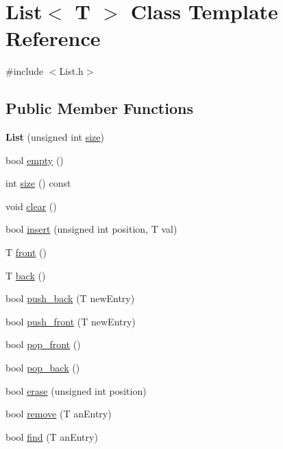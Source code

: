 \hypertarget{class_list}{}\section{List$<$ T $>$ Class Template Reference}
\label{class_list}


{\ttfamily \#include $<$List.\+h$>$}

\subsection*{Public Member Functions}
\begin{DoxyCompactItemize}
\item 
\mbox{\label{class_list_a210dcb839a4a5da20c98d0cd48e526f8}} 
{\bfseries List} (unsigned int \hyperlink{class_list_aec8852ab225094e14ad424e8d71a4dac}{size})
\item 
bool \hyperlink{class_list_a3737ca60365287ce663393d8c07d1a41}{empty} ()
\item 
int \hyperlink{class_list_aec8852ab225094e14ad424e8d71a4dac}{size} () const
\item 
void \hyperlink{class_list_ae296516a252e11963dbf963727ce429a}{clear} ()
\item 
bool \hyperlink{class_list_a9c20ddd34151f1fdf67549f3c94364da}{insert} (unsigned int position, T val)
\item 
T \hyperlink{class_list_a2606aeb0b00885fd7b3037a29ae28c8b}{front} ()
\item 
T \hyperlink{class_list_adcdd54cf42f6a98990618901e1fafa59}{back} ()
\item 
bool \hyperlink{class_list_adef1cfd54ad3f25eb27acde794e7f279}{push\+\_\+back} (T new\+Entry)
\item 
bool \hyperlink{class_list_a7ad16a889175f6bbb32aeb295c8f30c3}{push\+\_\+front} (T new\+Entry)
\item 
bool \hyperlink{class_list_a60579fbdaaceccb61aa5d8e33224e045}{pop\+\_\+front} ()
\item 
bool \hyperlink{class_list_aa6ff98e23b4ceea509e3a29fa5ceecd7}{pop\+\_\+back} ()
\item 
bool \hyperlink{class_list_a0af93f391664cbd3476b1a0fe0d3619e}{erase} (unsigned int position)
\item 
bool \hyperlink{class_list_a91f71c17d25baa99323e99297695492f}{remove} (T an\+Entry)
\item 
bool \hyperlink{class_list_a2be90274aca8ed14ede6d6892b4e82f1}{find} (T an\+Entry)

\end{DoxyCompactItemize}
